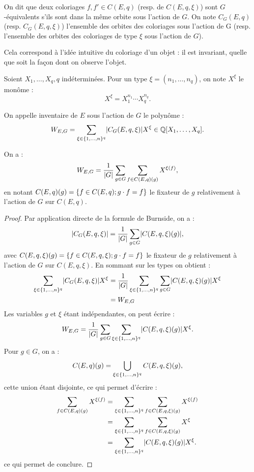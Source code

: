 \begin{defn}
On dit que deux coloriages $f, f' \in C(E,q)$ (resp. de $C(E,q, \xi)$) sont $G$-équivalents s'ils sont dans la même orbite 
sous l'action de $G$. On note $C_G(E,q)$ (resp. $C_G(E,q,\xi)$) l'ensemble des orbites des coloriages sous l'action de G
(resp. l'ensemble des orbites des coloriages de type $\xi$ sous l'action de $G$).
\end{defn}

\begin{rmq}
Cela correspond à l'idée intuitive du coloriage d'un objet : il est invariant, quelle que soit la façon dont on observe l'objet.
\end{rmq}

\begin{nota}
Soient $X_1, \dots, X_q, q$ indéterminées. Pour un type $\xi=(n_1, \dots, n_q)$, on note $X^{\xi}$ le monôme :
\[ X^{\xi} = X_1^{n_1} \cdots X_q^{n_q} . \]
\end{nota}

\begin{defn}[Inventaire]
On appelle inventaire de $E$ sous l'action de $G$ le polynôme :
\[ W_{E,G} = \sum_{\xi \in \{ 1, \dots, n \}^q} \lvert C_G(E,q,\xi)\rvert X^{\xi} \in \mathbb{Q}[X_1, \dots, X_q] . \]
\end{defn}

\begin{lem}
\label{lem:2}
On a :
\[ W_{E,G} = \dfrac1{\lvert G\rvert} \sum_{g \in G} \sum_{f \in C(E,q)(g)} X^{\xi(f)} , \]
en notant $C(E,q)(g) = \{ f \in C(E,q) ; g \cdot f = f \}$ le fixateur de $g$ relativement à l'action de $G$ sur $C(E,q)$.
\end{lem}

\begin{proof}
Par application directe de la formule de Burnside, on a :
\[ \lvert C_G(E,q,\xi)\rvert = \dfrac1{\lvert G\rvert} \sum_{g \in G} \lvert C(E,q,\xi)(g)\rvert , \]
avec $C(E,q, \xi)(g) = \{ f \in C(E,q, \xi) ; g \cdot f = f \}$ le fixateur de $g$ relativement à l'action de $G$ sur $C(E,q, \xi)$.
En sommant sur les types on obtient :
\begin{align*}
\sum_{\xi \in \{ 1, \dots, n \}^q} \lvert C_G(E,q,\xi)\rvert X^{\xi} & =  
\dfrac1{\lvert G\rvert} \sum_{\xi \in \{ 1, \dots, n \}^q} \sum_{g \in G} \lvert C(E,q,\xi)(g)\rvert  X^{\xi} \\
& = W_{E,G}
\end{align*}
Les variables $g$ et $\xi$ étant indépendantes, on peut écrire :
\[ W_{E,G} = \dfrac1{\lvert G\rvert} \sum_{g \in G} \sum_{\xi \in \{ 1, \dots, n \}^q} \lvert C(E,q,\xi)(g)\rvert  X^{\xi} . \]
Pour $g \in G$, on a :
\[ C(E,q)(g) = \bigcup_{\xi \in \{ 1, \dots, n \}^q} C(E,q,\xi)(g) , \]
cette union étant disjointe, ce qui permet d'écrire :
\begin{align*}
\sum_{f \in C(E,q)(g)} X^{\xi(f)} & = \sum_{\xi \in \{ 1, \dots, n \}^q} \sum_{f \in C(E,q,\xi)(g)} X^{\xi(f)} \\
& = \sum_{\xi \in \{ 1, \dots, n \}^q} \sum_{f \in C(E,q,\xi)(g)} X^{\xi} \\
& = \sum_{\xi \in \{ 1, \dots, n \}^q} \lvert C(E,q,\xi)(g)\rvert X^{\xi} .
\end{align*} 
ce qui permet de conclure.
\end{proof}

